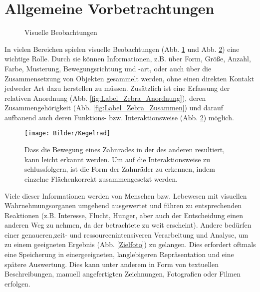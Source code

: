 \section{Allgemeine Vorbetrachtungen}
\begin{figure}[!t]
\label{VisuelleBeobachtung}
\caption{Visuelle Beobachtungen}
\end{figure}
In vielen Bereichen spielen visuelle Beobachtungen (Abb. \ref{VisuelleBeobachtung} und Abb. \ref{Zahnrad}) eine wichtige Rolle. Durch sie können Informationen, z.B. über Form, Größe, Anzahl, Farbe, Musterung, Bewegungsrichtung und -art, oder auch über die Zusammensetzung von Objekten gesammelt werden, ohne einen direkten Kontakt jedweder Art dazu herstellen zu müssen. Zusätzlich ist eine Erfassung der relativen Anordnung (Abb. \ref{fig:Label_Zebra_Anordnung}), deren Zusammengehörigkeit (Abb. \ref{fig:Label_Zebra_Zusammen}) und darauf aufbauend auch deren Funktions- bzw. Interaktionsweise (Abb. \ref{Zahnrad}) möglich.
\begin{figure}[!b]
\begin{center}
\texttt{[image: Bilder/Kegelrad]}
\caption{Dass die Bewegung eines Zahnrades in der des anderen resultiert, kann leicht erkannt werden. Um auf die Interaktionsweise zu schlussfolgern, ist die Form der Zahnräder zu erkennen, indem einzelne Flächen\newline korrekt zusammengesetzt werden. \cite{Kegelrad}}
\label{Zahnrad}
\end{center}
\end{figure}

Viele dieser Informationen werden von Menschen bzw. Lebewesen mit visuellen Wahrnehmungsorganen umgehend ausgewertet und führen zu entsprechenden Reaktionen (z.B. Interesse, Flucht, Hunger, aber auch der Entscheidung einen anderen Weg zu nehmen, da der betrachtete zu weit erscheint). Andere bedürfen einer genaueren,\linebreak zeit- und ressourcenintensiveren Verarbeitung und Analyse, um zu einem geeigneten Ergebnis (Abb. \ref{Zielfoto}) zu gelangen. Dies erfordert oftmals eine Speicherung in einer\linebreak geeigneten, langlebigeren Repräsentation und eine spätere Auswertung. Dies kann unter anderem in Form von textuellen Beschreibungen, manuell angefertigten Zeichnungen, Fotografien oder Filmen erfolgen. \cite{Jaehne2002}


